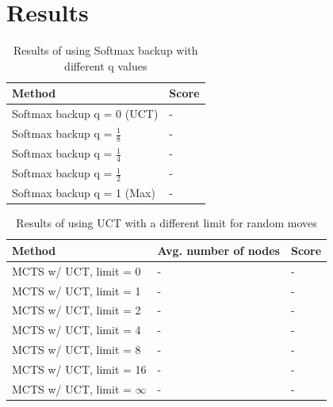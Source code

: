 \documentclass[10pt,a4paper]{article}
\begin{document}
\section{Results}
\renewcommand{\arraystretch}{1.5}
\begin{table}[h]
	\centering
	\begin{tabular}{| l | l |}
		\hline
		\textbf{Method} & \textbf{Score} 		\\ \hline
		Softmax backup q = 0 (UCT) 			& - \\ \hline
		Softmax backup q = $\frac{1}{8}$	& - \\ \hline
		Softmax backup q = $\frac{1}{4}$	& - \\ \hline
		Softmax backup q = $\frac{1}{2}$	& - \\ \hline
		Softmax backup q = 1 (Max)			& - \\ \hline
	\end{tabular}
	\caption{Results of using Softmax backup with different q values}
	\label{tab:softmax_results}
\end{table}

\begin{table}[h]
	\centering
	\begin{tabular}{| l | l | l |}
		\hline
		\textbf{Method} & \textbf{Avg. number of nodes} & \textbf{Score} \\ \hline
		MCTS w/ UCT, limit = 0			& - & - \\ \hline
		MCTS w/ UCT, limit = 1			& - & - \\ \hline
		MCTS w/ UCT, limit = 2			& - & - \\ \hline
		MCTS w/ UCT, limit = 4			& - & - \\ \hline
		MCTS w/ UCT, limit = 8			& - & - \\ \hline
		MCTS w/ UCT, limit = 16			& - & - \\ \hline
		MCTS w/ UCT, limit = $\infty$	& - & - \\ \hline
	\end{tabular}
	\caption{Results of using UCT with a different limit for random moves}
	\label{tab:uct_results}
\end{table}
\end{document}
